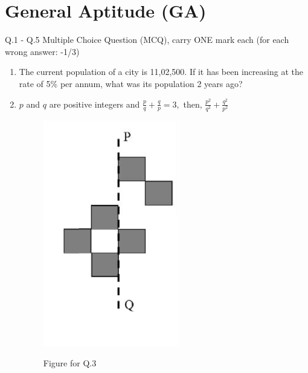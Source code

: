 \documentclass[journal]{IEEEtran}
\begin{document}
\section{General Aptitude (GA)}
Q.1 - Q.5 Multiple Choice Question (MCQ), carry ONE mark each (for each wrong answer: -1/3)
\bigskip
\begin{enumerate}[start=1]
	\item The current population of a city is 11,02,500. If it has been increasing at the rate of 5\% per annum, what was its population 2 years ago?
    \hfill{}
\begin{enumerate}
\end{enumerate}

\item  $p$ and $q$ are positive integers and  $\frac{p}{q} + \frac{q}{p} = 3,$ then, $\frac{p^2}{q^2} + \frac{q^2}{p^2}$
\hfill{}
\begin{enumerate}
\end{enumerate}

\begin{figure}[H]
    \centering
    \includegraphics[width=0.3\columnwidth]{figs/image(q3).png}
    \label{Fig1}
    \caption{Figure for Q.3}
\end{figure}


\end{enumerate}
\end{document}
